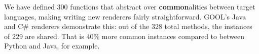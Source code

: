 \documentclass[sigplan,review,prologue,dvipsnames]{acmart}
\newcommand{\Csharp}{C\#}
\newcommand{\abbrev}[1]{\textbf{#1}}
\newcommand{\common}{\abbrev{common}}
\begin{document}
We have defined $300$ functions that abstract over 
\common alities between target languages, making writing new renderers
fairly straightforward. GOOL's Java and \Csharp{} renderers 
demonstrate this: out of the $328$ total methods,
the instances of $229$ are shared. That is
$40\%$ more common instances compared to between Python and Java, for example.

\end{document}
